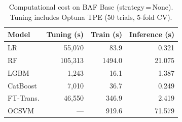 \begin{table}[H]
\centering
\caption{Computational cost on BAF Base (strategy\,=\,None). Tuning includes Optuna TPE (50 trials, 5-fold CV).}
\label{tab:cost_baf}
\begin{tabular}{l r r r}
\toprule
Model & Tuning (s) & Train (s) & Inference (s) \\
\midrule
LR         & 55,070 & 83.9 & 0.321 \\
RF         & 105,313 & 1494.0 & 21.075 \\
LGBM       & 1,243 & 16.1 & 1.387 \\
CatBoost   & 7,010 & 36.7 & 0.249 \\
FT-Trans.  & 46,550 & 346.9 & 2.419 \\
OCSVM      & --- & 919.6 & 71.579 \\
\bottomrule
\end{tabular}
\end{table}